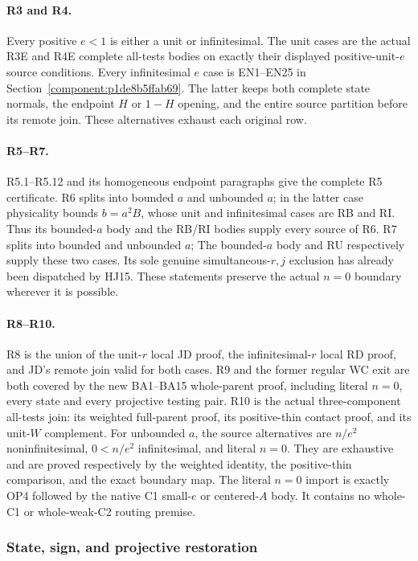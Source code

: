 \paragraph{R3 and R4.}
Every positive \(e<1\) is either a unit or
infinitesimal.  The unit cases are the actual
R3E and R4E complete all-tests bodies on exactly their displayed
positive-unit-$e$ source conditions.  Every infinitesimal
\(e\) case is EN1--EN25 in
Section~\ref{component:p1de8b5ffab69}.
The latter keeps both complete state normals,
the endpoint \(H\) or \(1-H\) opening, and the
entire source partition before its remote join.
These alternatives exhaust each original row.

\paragraph{R5--R7.}
R5.1--R5.12 and its homogeneous endpoint paragraphs give the
complete R5 certificate.
R6 splits into bounded \(a\) and unbounded \(a\);
in the latter case physicality bounds \(b=a^2B\),
whose unit and infinitesimal cases are RB and RI.
Thus its bounded-$a$ body and the RB/RI bodies supply every
source of R6.
R7 splits into bounded and unbounded \(a\);
The bounded-$a$ body and RU respectively supply these two cases.
Its sole genuine simultaneous-\(r,j\) exclusion
has already been dispatched by HJ15.
These statements preserve the actual \(n=0\)
boundary wherever it is possible.

\paragraph{R8--R10.}
R8 is the union of the unit-\(r\) local JD proof,
the infinitesimal-\(r\) local RD proof, and JD's
remote join valid for both cases.
R9 and the former regular WC exit are both covered by the new
BA1--BA15 whole-parent proof, including literal $n=0$, every state
and every projective testing pair.
R10 is the actual three-component all-tests join:
its weighted full-parent proof, its positive-thin
contact proof, and its unit-\(W\) complement.
For unbounded $a$, the source alternatives are $n/e^2$
noninfinitesimal, $0<n/e^2$ infinitesimal, and literal $n=0$.
They are exhaustive and are proved respectively by the weighted
identity, the positive-thin comparison, and the exact boundary map.
The literal \(n=0\) import is exactly OP4 followed
by the native C1 small-\(e\) or centered-\(A\)
body.  It contains no whole-C1 or whole-weak-C2
routing premise.

\subsubsection*{State, sign, and projective restoration}

